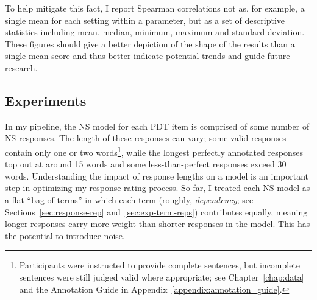 To help mitigate this fact, I report Spearman correlations not as, for example, a single mean for each setting within a parameter, but as a set of descriptive statistics including mean, median, minimum, maximum and standard deviation. These figures should give a better depiction of the shape of the results than a single mean score and thus better indicate potential trends and guide future research.

\subsection{ Experiments}
\label{sec:exp-term-norm}

In my pipeline, the NS model for each PDT item is comprised of some number of NS responses.  The length of these responses can vary; some valid responses contain only one or two words\footnote{Participants were instructed to provide complete sentences, but incomplete sentences were still judged valid where appropriate; see Chapter~\ref{chap:data} and the Annotation Guide in Appendix~\ref{appendix:annotation_guide}.}, while the longest perfectly annotated responses top out at around 15 words and some less-than-perfect responses exceed 30 words. Understanding the impact of response lengths on a model is an important step in optimizing my response rating process. So far, I treated each NS model as a flat ``bag of terms'' in which each term (roughly, \textit{dependency}; see Sections~\ref{sec:response-rep} and~\ref{sec:exp-term-reps}) contributes equally, meaning longer responses carry more weight than shorter responses in the model. This has the potential to introduce noise. 

